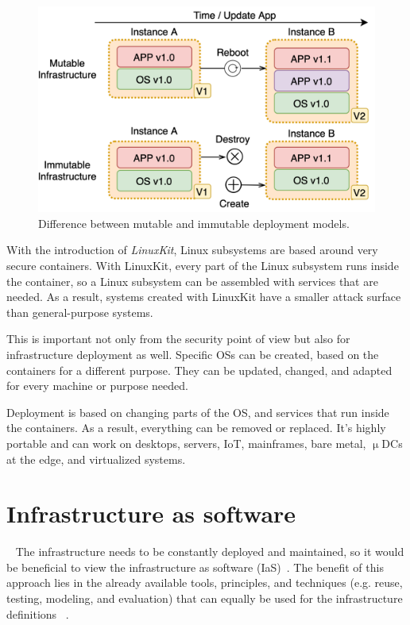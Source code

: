 \begin{figure}[H]
	\begin{center}
		\includegraphics[scale=0.80]{images/Figure12}
	\end{center}
	\vspace{-0.6cm}
	\caption{Difference between mutable and immutable deployment models.}
	\label{fig:fig12}
\end{figure}

\noindent
With the introduction of \textit{LinuxKit}, Linux subsystems are based around very secure containers. With LinuxKit, every part of the Linux subsystem runs inside the container, so a Linux subsystem can be assembled with services that are needed. As a result, systems created with LinuxKit have a smaller attack surface~\cite{abs-1802-10375} than general-purpose systems. 

This is important not only from the security point of view but also for infrastructure deployment as well. Specific OSs can be created, based on the containers for a different purpose. They can be updated, changed, and adapted for every machine or purpose needed.

Deployment is based on changing parts of the OS, and services that run inside the containers. As a result, everything can be removed or replaced. It's highly portable and can work on desktops, servers, IoT, mainframes, bare metal, $\upmu$DCs at the edge, and virtualized systems.

\section{Infrastructure as software}~\label{sec:ias}
%
The infrastructure needs to be constantly deployed and maintained, so it would be beneficial to view the infrastructure as software (IaS)~\cite{Fitzgerald}. The benefit of this approach lies in the already available tools, principles, and techniques (e.g. reuse, testing, modeling, and evaluation) that can equally be used for the infrastructure definitions ~\cite{Osterweil, Fitzgerald}.

